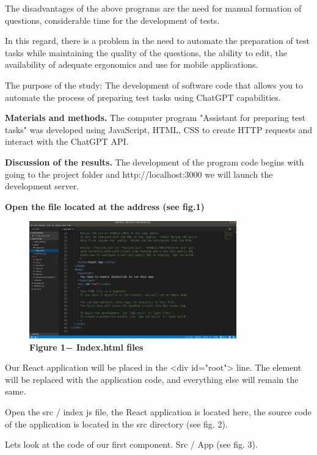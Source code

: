 \begin{multicols}{2}


The disadvantages of the above programs are the need for manual
formation of questions, considerable time for the development of tests.

In this regard, there is a problem in the need to automate the
preparation of test tasks while maintaining the quality of the
questions, the ability to edit, the availability of adequate ergonomics
and use for mobile applications.

The purpose of the study: The development of software code that allows
you to automate the process of preparing test tasks using ChatGPT
capabilities.

{\bfseries Materials and methods.} The computer program "Assistant for
preparing test tasks" was developed using JavaScript, HTML, CSS to
create HTTP requests and interact with the ChatGPT API.

{\bfseries Discussion of the results.} The development of the program code
begins with going to the project folder and http://localhost:3000 we
will launch the development server.
\end{multicols}


{\bfseries Open the file located at the address (see fig.1)}
\begin{figure}[H]
	\centering
	\includegraphics[width=0.8\textwidth]{assets/126}
	\caption*{\bfseries Figure 1− Index.html files}
\end{figure}
\begin{multicols}{2}

Our React application will be placed in the \textless div
id="root"\textgreater{} line. The element will be replaced with the
application code, and everything else will remain the same.

Open the src / index js file, the React application is located here, the
source code of the application is located in the src directory (see fig.
2).

Let\textquotesingle s look at the code of our first component. Src / App (see fig. 3). 
\end{multicols}


